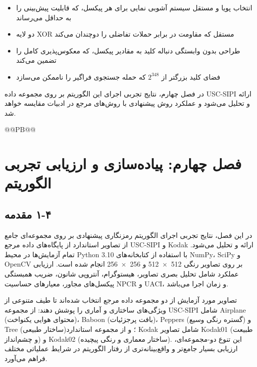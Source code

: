 \begin{itemize}
    \item انتخاب پویا و مستقل سیستم آشوبی نمایی برای هر پیکسل، که قابلیت پیش‌بینی را به حداقل می‌رساند
\end{itemize}

\begin{itemize}
    \item دو لایه XOR مستقل که مقاومت در برابر حملات تفاضلی را دوچندان می‌کند
\end{itemize}

\begin{itemize}
    \item طراحی بدون وابستگی دنباله کلید به مقادیر پیکسل، که معکوس‌پذیری کامل را تضمین می‌کند
\end{itemize}

\begin{itemize}
    \item فضای کلید بزرگتر از $2^{348}$ که حمله جستجوی فراگیر را ناممکن می‌سازد
\end{itemize}

در فصل چهارم، نتایج تجربی اجرای این الگوریتم بر روی مجموعه داده USC-SIPI ارائه و تحلیل می‌شود و عملکرد روش پیشنهادی با روش‌های مرجع در ادبیات مقایسه خواهد شد.


@@PB@@



\chapter{فصل چهارم: پیاده‌سازی و ارزیابی تجربی الگوریتم}
\section{‏۴‏-‏۱‏ مقدمه}

در این فصل، نتایج تجربی اجرای الگوریتم رمزنگاری پیشنهادی بر روی مجموعه‌ای جامع از تصاویر استاندارد از پایگاه‌های داده مرجع USC-SIPI و Kodak ارائه و تحلیل می‌شود. تمام آزمایش‌ها در محیط Python 3.10{} با استفاده از کتابخانه‌های NumPy، SciPy و OpenCV بر روی تصاویر رنگی 512 × 512 و 256 × 256 انجام شده است. ارزیابی عملکرد شامل تحلیل بصری تصاویر، هیستوگرام، آنتروپی شانون، ضریب همبستگی پیکسل‌های مجاور، معیارهای حساسیت NPCR و UACI، و زمان اجرا می‌باشد.

تصاویر مورد آزمایش از دو مجموعه داده مرجع انتخاب شده‌اند تا طیف متنوعی از ویژگی‌های ساختاری و آماری را پوشش دهند: از مجموعه USC-SIPI شامل Airplane (محتوای هوایی یکنواخت)، Baboon (بافت پرجزئیات)، Peppers (گستره رنگی وسیع) و Tree (ساختار طبیعی)؛ و از مجموعه استاندارد Kodak شامل تصاویر Kodak01 (طبیعت و چشم‌انداز) و Kodak02 (ساختار معماری و رنگی پیچیده). این تنوع دو-مجموعه‌ای، ارزیابی بسیار جامع‌تر و واقع‌بینانه‌تری از رفتار الگوریتم در شرایط عملیاتی مختلف فراهم می‌آورد.

